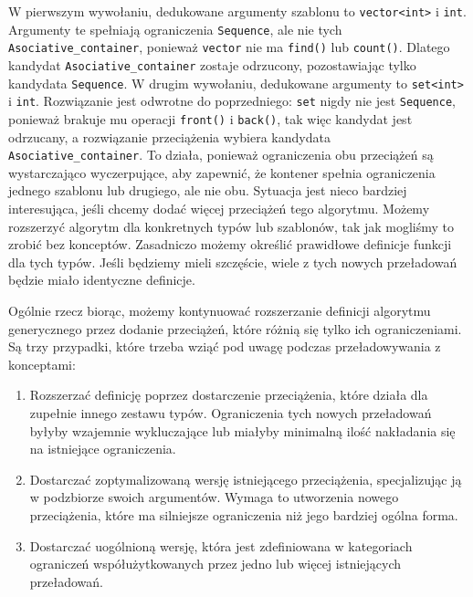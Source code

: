 \documentclass[11pt, a4paper]{article}
\begin{document}
W pierwszym wywołaniu, dedukowane argumenty szablonu to \verb#vector<int># i \verb#int#. Argumenty te spełniają ograniczenia \verb#Sequence#, ale nie tych \newline \verb#Asociative_container#, ponieważ \verb#vector# nie ma \verb#find()# lub \verb#count()#. Dlatego kandydat \verb#Asociative_container# zostaje odrzucony, pozostawiając tylko kandydata \verb#Sequence#. W drugim wywołaniu, dedukowane argumenty to \verb#set<int># i \verb#int#. Rozwiązanie jest odwrotne do poprzedniego: \verb#set# nigdy nie jest \verb#Sequence#, ponieważ brakuje mu operacji \verb#front()# i \verb#back()#, tak więc kandydat jest odrzucany, a rozwiązanie przeciążenia wybiera kandydata \verb#Asociative_container#. To działa, ponieważ ograniczenia obu przeciążeń są wystarczająco wyczerpujące, aby zapewnić, że kontener spełnia ograniczenia jednego szablonu lub drugiego, ale nie obu. Sytuacja jest nieco bardziej interesująca, jeśli chcemy dodać więcej przeciążeń tego algorytmu. Możemy rozszerzyć algorytm dla konkretnych typów lub szablonów, tak jak mogliśmy to zrobić bez konceptów. Zasadniczo możemy określić prawidłowe definicje funkcji dla tych typów. Jeśli będziemy mieli szczęście, wiele z tych nowych przeładowań będzie miało identyczne definicje.

Ogólnie rzecz biorąc, możemy kontynuować rozszerzanie definicji algorytmu generycznego przez dodanie przeciążeń, które różnią się tylko ich ograniczeniami. Są trzy przypadki, które trzeba wziąć pod uwagę podczas przeładowywania z konceptami:

\begin{enumerate}
\item Rozszerzać definicję poprzez dostarczenie przeciążenia, które działa dla zupełnie innego zestawu typów. Ograniczenia tych nowych przeładowań byłyby wzajemnie wykluczające lub miałyby minimalną ilość nakładania się na istniejące ograniczenia.

\item Dostarczać zoptymalizowaną wersję istniejącego przeciążenia, specjalizując ją w podzbiorze swoich argumentów. Wymaga to utworzenia nowego przeciążenia, które ma silniejsze ograniczenia niż jego bardziej ogólna forma.

\item Dostarczać uogólnioną wersję, która jest zdefiniowana w kategoriach ograniczeń współużytkowanych przez jedno lub więcej istniejących przeładowań.

\end{enumerate}
\end{document}
